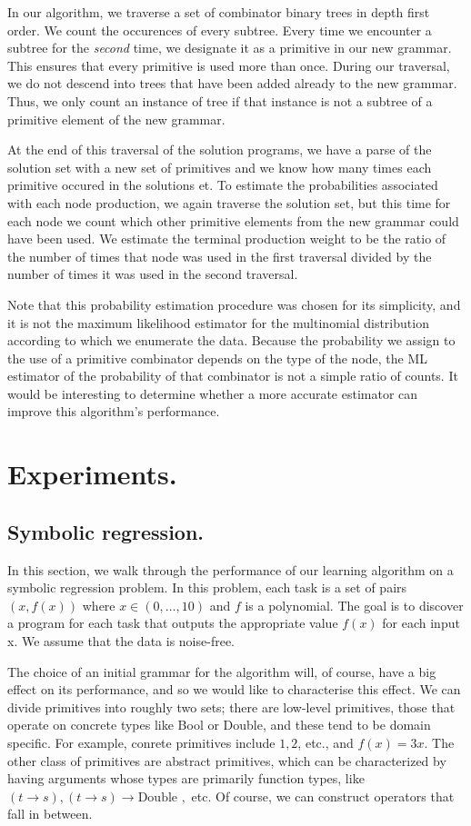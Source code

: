 \documentclass{article}
\begin{document}
In our algorithm, we traverse a set of combinator binary trees in
depth first order. We count the occurences of every subtree. Every
time we encounter a subtree for the \emph{second} time, we designate
it as a primitive in our new grammar. This ensures that every
primitive is used more than once. During our traversal, we do not
descend into trees that have been added already to the new
grammar. Thus, we only count an instance of tree if that instance is
not a subtree of a primitive element of the new grammar.

At the end of this traversal of the solution programs, we have a parse
of the solution set with a new set of primitives and we know how many
times each primitive occured in the solutions et. To estimate the
probabilities associated with each node production, we again traverse
the solution set, but this time for each node we count which other
primitive elements from the new grammar could have been used. We
estimate the terminal production weight to be the ratio of the number
of times that node was used in the first traversal divided by the
number of times it was used in the second traversal. 

Note that this probability estimation procedure was chosen for its
simplicity, and it is not the maximum likelihood estimator for the
multinomial distribution according to which we enumerate the
data. Because the probability we assign to the use of a primitive
combinator depends on the type of the node, the ML estimator of the
probability of that combinator is not a simple ratio of counts. It
would be interesting to determine whether a more accurate estimator
can improve this algorithm's performance.

\section{Experiments.}
\subsection{Symbolic regression.}

In this section, we walk through the performance of our learning
algorithm on a symbolic regression problem. In this problem,
each task is a set of pairs $ (x, f(x))$ where $x \in (0, \dots, 10)$
and $f$ is a polynomial. The goal is to discover a program for each
task that outputs the appropriate value $f(x)$ for each input x. We
assume that the data is noise-free.

The choice of an initial grammar for the algorithm will, of course,
have a big effect on its performance, and so we would like to
characterise this effect. We can divide primitives into roughly two
sets; there are low-level primitives, those that operate on concrete
types like Bool or Double, and these tend to be domain specific. For
example, conrete primitives include $1, 2$, etc., and $f(x) = 3x$. The
other class of primitives are abstract primitives, which can be
characterized by having arguments whose types are primarily function
types, like $(t \rightarrow s), (t \rightarrow s) \rightarrow \text{
  Double },$ etc. Of course, we can construct operators that fall in
between. 
\end{document}
